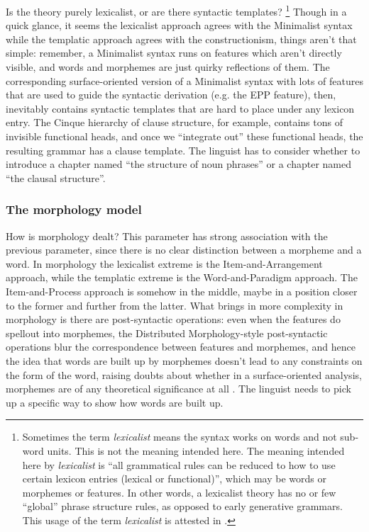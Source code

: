 \documentclass[UTF8, a4paper, oneside, scheme=plain]{ctexart}
\newcommand*{\term}[1]{\emph{#1}}
\begin{document}
Is the theory purely lexicalist, 
or are there syntactic templates?%
\footnote{
    Sometimes the term \term{lexicalist} means the syntax works on words 
    and not sub-word units.
    This is not the meaning intended here. 
    The meaning intended here by \term{lexicalist} is 
    ``all grammatical rules can be reduced to how to use certain lexicon entries (lexical or functional)'',
    which may be words or morphemes or features.
    In other words, a lexicalist theory has no or few ``global'' phrase structure rules,
    as opposed to early generative grammars.
    This usage of the term \term{lexicalist} is attested in \citet{matchin2020cortical}. 
}\label{fn:lexicalist-1}
Though in a quick glance, it seems the lexicalist approach agrees with the Minimalist syntax 
while the templatic approach agrees with the constructionism,
things aren't that simple:
remember, a Minimalist syntax runs on features which aren't directly visible,
and words and morphemes are just quirky reflections of them.
The corresponding surface-oriented version of a Minimalist syntax with lots of features 
that are used to guide the syntactic derivation (e.g. the EPP feature), then,
inevitably contains syntactic templates that are hard to place under any lexicon entry.
The Cinque hierarchy of clause structure, for example, contains tons of invisible functional heads,
and once we ``integrate out'' these functional heads,
the resulting grammar has a clause template.
The linguist has to consider whether to introduce 
a chapter named ``the structure of noun phrases''
or a chapter named ``the clausal structure''.

\subsubsection{The morphology model}

How is morphology dealt?
This parameter has strong association with the previous parameter, 
since there is no clear distinction between a morpheme and a word.
In morphology the lexicalist extreme is the Item-and-Arrangement approach,
while the templatic extreme is the Word-and-Paradigm approach.
The Item-and-Process approach is somehow in the middle, 
maybe in a position closer to the former and further from the latter. 
What brings in more complexity in morphology is 
there are post-syntactic operations:
even when the features do spellout into morphemes,
the Distributed Morphology-style post-syntactic operations 
blur the correspondence between features and morphemes,
and hence the idea that words are built up by morphemes 
doesn't lead to any constraints on the form of the word,
raising doubts about whether in a surface-oriented analysis,
morphemes are of any theoretical significance at all \citep{anderson2017words}.
The linguist needs to pick up a specific way to show how words are built up.
\end{document}
